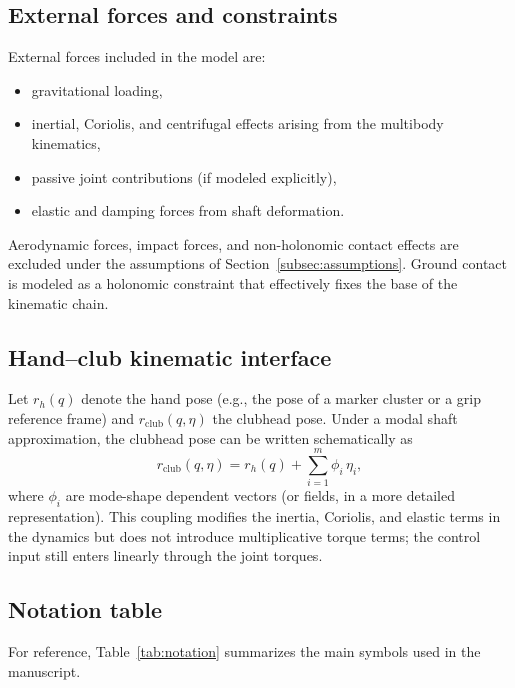 \documentclass[12pt]{article}
\begin{document}
\subsection{External forces and constraints}
\label{subsec:external_forces}

External forces included in the model are:
\begin{itemize}
  \item gravitational loading,
  \item inertial, Coriolis, and centrifugal effects arising from the multibody kinematics,
  \item passive joint contributions (if modeled explicitly),
  \item elastic and damping forces from shaft deformation.
\end{itemize}
Aerodynamic forces, impact forces, and non-holonomic contact effects are excluded under the assumptions of Section~\ref{subsec:assumptions}. Ground contact is modeled as a holonomic constraint that effectively fixes the base of the kinematic chain.

\subsection{Hand--club kinematic interface}
\label{subsec:hand_club}

Let \( r_{h}(q) \) denote the hand pose (e.g., the pose of a marker cluster or a grip reference frame) and \( r_{\text{club}}(q,\eta) \) the clubhead pose. Under a modal shaft approximation, the clubhead pose can be written schematically as
\begin{equation}
  r_{\text{club}}(q,\eta) = r_{h}(q) + \sum_{i=1}^{m} \phi_{i} \, \eta_{i},
\end{equation}
where \( \phi_{i} \) are mode-shape dependent vectors (or fields, in a more detailed representation). This coupling modifies the inertia, Coriolis, and elastic terms in the dynamics but does not introduce multiplicative torque terms; the control input still enters linearly through the joint torques.

\subsection{Notation table}
\label{subsec:notation}

For reference, Table~\ref{tab:notation} summarizes the main symbols used in the manuscript.
\end{document}
